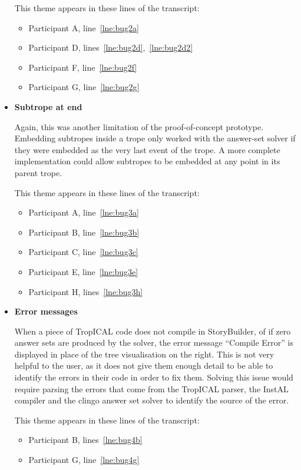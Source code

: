 \documentclass[11pt]{report}
\newcommand{\lref}[1]{\hyperlink{llineno:#1}{\ref*{#1}}}
\begin{document}
\begin{itemize}
This theme appears in these lines of the transcript:

\begin{itemize}
\item Participant A, line~\lref{lne:bug2a}
\item Participant D, lines~\lref{lne:bug2d},~\lref{lne:bug2d2}
\item Participant F, line~\lref{lne:bug2f}
\item Participant G, line~\lref{lne:bug2g}
\end{itemize}

\item \textbf{Subtrope at end}

Again, this was another limitation of the proof-of-concept prototype. Embedding
subtropes inside a trope only worked with the answer-set solver if they were
embedded as the very last event of the trope. A more complete implementation
could allow subtropes to be embedded at any point in its parent trope.

This theme appears in these lines of the transcript:
  
\begin{itemize}
\item Participant A, line~\lref{lne:bug3a}
\item Participant B, line~\lref{lne:bug3b}
\item Participant C, line~\lref{lne:bug3c}
\item Participant E, line~\lref{lne:bug3e}
\item Participant H, lines~\lref{lne:bug3h}
\end{itemize}

\item \textbf{Error messages}

When a piece of TropICAL code does not compile in StoryBuilder, of if zero
answer sets are produced by the solver, the error message ``Compile Error''
is displayed in place of the tree visualisation on the right. This is not very
helpful to the user, as it does not give them enough detail to be able to
identify the errors in their code in order to fix them. Solving this issue would
require parsing the errors that come from the TropICAL parser, the InstAL
compiler and the clingo answer set solver to identify the source of the error.

This theme appears in these lines of the transcript:

\begin{itemize}
\item Participant B, lines~\lref{lne:bug4b}
\item Participant G, line~\lref{lne:bug4g}
\end{itemize}
\end{itemize}
\end{document}
